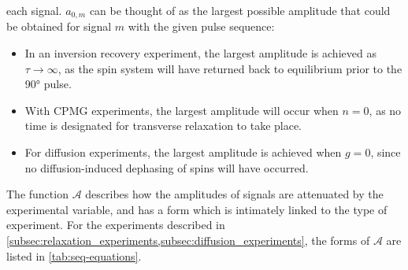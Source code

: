 each signal. $a_{0,m}$ can be thought of as the largest
possible amplitude that could be obtained for signal $m$ with the given
pulse sequence:
\begin{itemize}
    \item In an inversion recovery experiment, the largest amplitude is
        achieved as $\tau \rightarrow \infty$, as the spin system will have
        returned back to equilibrium prior to the \ang{90} pulse.
    \item With \ac{CPMG} experiments, the largest amplitude will occur when
        $n = 0$, as no time is designated for transverse
        relaxation to take place.
    \item For diffusion experiments, the largest amplitude is achieved when
        $g=0$, since no diffusion-induced dephasing of spins will have
        occurred.
\end{itemize}
The function $\mathcal{A}$ describes how the amplitudes of signals are
attenuated by the experimental variable, and has a form which is intimately
linked to the type of experiment. For the experiments described in
\cref{subsec:relaxation_experiments,subsec:diffusion_experiments},
the forms of $\mathcal{A}$ are listed in \cref{tab:seq-equations}.
